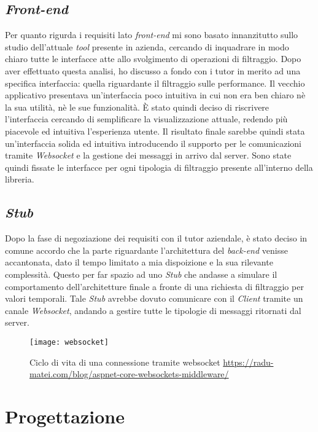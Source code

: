 \subsection{\textit{Front-end}}
Per quanto rigurda i requisiti lato \textit{front-end} mi sono basato innanzitutto sullo studio dell'attuale \textit{tool} presente in azienda, cercando di inquadrare in modo chiaro tutte le interfacce atte allo svolgimento di operazioni di filtraggio. Dopo aver effettuato questa analisi, ho discusso a fondo con i tutor in merito ad una specifica interfaccia: quella riguardante il filtraggio sulle performance. Il vecchio applicativo presentava un'interfaccia poco intuitiva in cui non era ben chiaro nè la sua utilità, nè le sue funzionalità. È stato quindi deciso di riscrivere l'interfaccia cercando di semplificare la visualizzazione attuale, redendo più piacevole ed intuitiva l'esperienza utente. Il risultato finale sarebbe quindi stata un'interfaccia solida ed intuitiva introducendo il supporto per le comunicazioni tramite \textit{\gls{Websocket}} e la gestione dei messaggi in arrivo dal server. Sono state quindi fissate le interfacce per ogni tipologia di filtraggio presente all'interno della libreria.

\subsection{\textit{Stub}}
Dopo la fase di negoziazione dei requisiti con il tutor aziendale, è stato deciso in comune accordo che la parte riguardante l'architettura del \textit{back-end} venisse accantonata, dato il tempo limitato a mia dispoizione e la sua rilevante complessità. Questo per far spazio ad uno \textit{Stub} che andasse a simulare il comportamento dell'architetture finale a fronte di una richiesta di filtraggio per valori temporali. Tale \textit{Stub} avrebbe dovuto comunicare con il \textit{Client} tramite un canale \textit{Websocket}, andando a gestire tutte le tipologie di messaggi ritornati dal server.
\begin{figure}[!h] 
	\centering 
	\texttt{[image: websocket]} 
	\caption{Ciclo di vita di una connessione tramite websocket \url{https://radu-matei.com/blog/aspnet-core-websockets-middleware/}}
\end{figure}
\newpage
\section{Progettazione}
